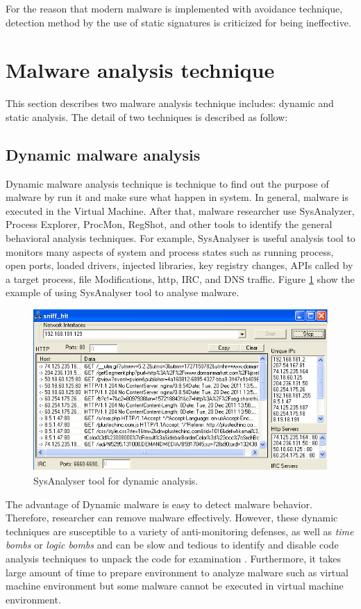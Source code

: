 For the reason that modern malware is implemented with avoidance technique, detection method by the use of static signatures is criticized for being ineffective.   
\section{Malware analysis technique}
This section describes two malware analysis technique includes: dynamic and static analysis. The detail of two techniques is described as follow: 
\subsection{Dynamic malware analysis}
Dynamic malware analysis technique is technique to find out the purpose of malware by run it and make sure what happen in system. In general, malware is executed in the Virtual Machine. After that, malware researcher use SysAnalyzer, Process Explorer, ProcMon, RegShot, and other tools to identify the general behavioral analysis techniques. For example, SysAnalyser is useful analysis tool to monitors many aspects of system and process states such as running process, open ports, loaded drivers, injected libraries, key registry changes, APIs called by a target process, file Modifications, http, IRC, and DNS traffic. Figure \ref{fig:SysAnalyser} show the example of using SysAnalyser tool to analyse malware. 


\begin{figure}[h!]
\centering
\includegraphics[width=1\textwidth]{graph/SysAnalyser.png}
\caption{SysAnalyser tool for dynamic analysis.}
\label{fig:SysAnalyser}
\end{figure}

The advantage of Dynamic malware is easy to detect malware behavior. Therefore, researcher can remove malware effectively. However, these dynamic techniques are susceptible to a variety of anti-monitoring defenses, as well as \emph{time bombs} or \emph{logic bombs} and can be slow and tedious to identify and disable code analysis techniques to unpack the code for examination \cite{georg}. Furthermore, it takes large amount of time to prepare environment to analyze malware such as virtual machine environment but some malware cannot be executed in virtual machine environment. 

